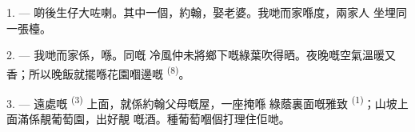 %
%
%
%
%
%

\VUsaut{4.0mm}
\VUsaut{1.6mm}
\VUsaut{3.2mm}

\VUsaut{1.6mm}
\VUsaut{2.6mm}

\VUsaut{3.0mm}

1. --- 啲後生仔大咗喇。其中一個，約翰，娶老婆。我哋而家喺度，兩家人
坐埋同一張檯。

2. --- 我哋而家係，喺。同嘅
冷風仲未將鄉下嘅綠葉吹得晒。夜晚嘅空氣溫暖又香；所以晚飯就擺喺花園嗰邊嘅
 \textsuperscript{(8)}。

3. --- 遠處嘅 \textsuperscript{(3)} 上面，就係約翰父母嘅屋，一座掩喺
綠蔭裏面嘅雅致 \textsuperscript{(1)}；山坡上面滿係靚葡萄園，出好靚
嘅酒。種葡萄嗰個打理住佢哋。

